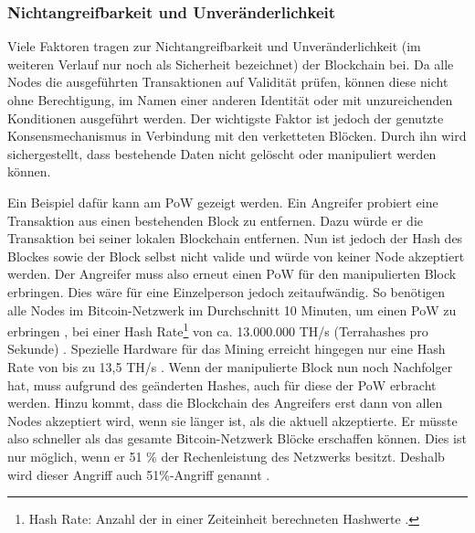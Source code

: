 \subsubsection{Nichtangreifbarkeit und Unveränderlichkeit}
\label{subsec:immutability}
Viele Faktoren tragen zur Nichtangreifbarkeit und Unveränderlichkeit (im weiteren Verlauf nur noch als Sicherheit bezeichnet) der Blockchain bei. Da alle Nodes die ausgeführten Transaktionen auf Validität prüfen, können diese nicht ohne Berechtigung, im Namen einer anderen Identität oder mit unzureichenden Konditionen ausgeführt werden. Der wichtigste Faktor ist jedoch der genutzte Konsensmechanismus in Verbindung mit den verketteten Blöcken. Durch ihn wird sichergestellt, dass bestehende Daten nicht gelöscht oder manipuliert werden können.

Ein Beispiel dafür kann am \acs{PoW} gezeigt werden. Ein Angreifer probiert eine Transaktion aus einen bestehenden Block zu entfernen. Dazu würde er die Transaktion bei seiner lokalen Blockchain entfernen. Nun ist jedoch der Hash des Blockes sowie der Block selbst nicht valide und würde von keiner Node akzeptiert werden. Der Angreifer muss also erneut einen \acs{PoW} für den manipulierten Block erbringen. Dies wäre für eine Einzelperson jedoch zeitaufwändig. So benötigen alle Nodes im Bitcoin-Netzwerk im Durchschnitt 10 Minuten, um einen \acs{PoW} zu erbringen \cite[S.~173]{AntonopoulosMasteringbitcoin2015}, bei einer Hash Rate\footnote{Hash Rate: Anzahl der in einer Zeiteinheit berechneten Hashwerte \cite{BitcoinTeamBitcoinGlossar}.} von ca. 13.000.000 TH/s (Terrahashes pro Sekunde) \cite{EtherscanEthereumNetworkHashRate}. Spezielle Hardware für das Mining erreicht hingegen nur eine Hash Rate von bis zu 13,5 TH/s \cite{BitcoinminingLearnBitcoinmining}. Wenn der manipulierte Block nun noch Nachfolger hat, muss aufgrund des geänderten Hashes, auch für diese der \acs{PoW} erbracht werden. Hinzu kommt, dass die Blockchain des Angreifers erst dann von allen Nodes akzeptiert wird, wenn sie länger ist, als die aktuell akzeptierte. Er müsste also schneller als das gesamte Bitcoin-Netzwerk Blöcke erschaffen können. Dies ist nur möglich, wenn er 51 \% der Rechenleistung des Netzwerks besitzt. Deshalb wird dieser Angriff auch 51\%-Angriff genannt \cite[S.~83]{SwanBlockchainblueprintnew2015} \cite{EthereumTeamEthereumWhitePaper2017}. 

